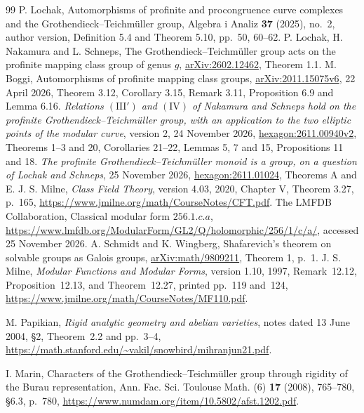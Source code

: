 \documentclass[11pt,a4paper]{article}
\theoremstyle{definition}
\theoremstyle{remark}
\begin{document}
\begin{thebibliography}{99}
 P. Lochak, Automorphisms of profinite and procongruence curve complexes and the Grothendieck--Teichm\"uller group, Algebra i Analiz \textbf{37} (2025), no.~2, author version, Definition 5.4 and Theorem 5.10, pp.~50, 60--62.
 P. Lochak, H. Nakamura and L. Schneps, The Grothendieck--Teichm\"uller group acts on the profinite mapping class group of genus $g$, \href{https://arxiv.org/abs/2602.12462}{arXiv:2602.12462}, Theorem 1.1.
 M. Boggi, Automorphisms of profinite mapping class groups, \href{https://arxiv.org/abs/2011.15075v6}{arXiv:2011.15075v6}, 22 April 2026, Theorem 3.12, Corollary 3.15, Remark 3.11, Proposition 6.9 and Lemma 6.16.
 \emph{Relations $(\mathrm{III}')$ and $(\mathrm{IV})$ of Nakamura and Schneps hold on the profinite Grothendieck--Teichm\"uller group, with an application to the two elliptic points of the modular curve}, version 2, 24 November 2026, \href{https://hexagonmath.org/2611.00940v2}{hexagon:2611.00940v2}, Theorems 1--3 and 20, Corollaries 21--22, Lemmas 5, 7 and 15, Propositions 11 and 18.
 \emph{The profinite Grothendieck--Teichm\"uller monoid is a group, on a question of Lochak and Schneps}, 25 November 2026, \href{https://hexagonmath.org/2611.01024}{hexagon:2611.01024}, Theorems A and E.
 J. S. Milne, \emph{Class Field Theory}, version 4.03, 2020, Chapter V, Theorem 3.27, p.~165, \url{https://www.jmilne.org/math/CourseNotes/CFT.pdf}.
 The LMFDB Collaboration, Classical modular form $256.1.c.a$, \url{https://www.lmfdb.org/ModularForm/GL2/Q/holomorphic/256/1/c/a/}, accessed 25 November 2026.
 A. Schmidt and K. Wingberg, Shafarevich's theorem on solvable groups as Galois groups, \href{https://arxiv.org/abs/math/9809211}{arXiv:math/9809211}, Theorem 1, p.~1.
J. S. Milne, \emph{Modular Functions and Modular Forms},
version 1.10, 1997, Remark~12.12, Proposition~12.13,
and Theorem~12.27, printed pp.~119 and~124,
\url{https://www.jmilne.org/math/CourseNotes/MF110.pdf}.

M. Papikian, \emph{Rigid analytic geometry and abelian varieties},
notes dated 13 June 2004, \S2, Theorem~2.2 and pp.~3--4,
\url{https://math.stanford.edu/~vakil/snowbird/mihranjun21.pdf}.

I. Marin, Characters of the Grothendieck--Teichm\"uller group through
rigidity of the Burau representation, Ann. Fac. Sci. Toulouse Math.
(6) \textbf{17} (2008), 765--780, \S6.3, p.~780,
\url{https://www.numdam.org/item/10.5802/afst.1202.pdf}.


\end{thebibliography}
\end{document}
